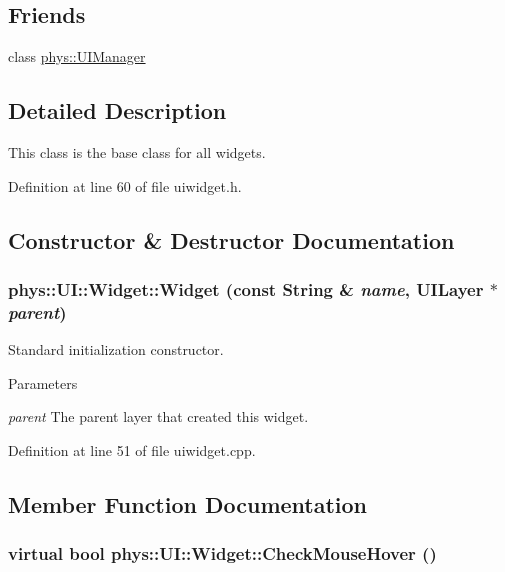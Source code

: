 \subsection*{Friends}
\begin{DoxyCompactItemize}
\item 
\hypertarget{classphys_1_1UI_1_1Widget_a4b52bf8c4d934bf192ccfc8198b55394}{
class \hyperlink{classphys_1_1UI_1_1Widget_a4b52bf8c4d934bf192ccfc8198b55394}{phys::UIManager}}
\label{d9/d48/classphys_1_1UI_1_1Widget_a4b52bf8c4d934bf192ccfc8198b55394}

\end{DoxyCompactItemize}


\subsection{Detailed Description}
This class is the base class for all widgets. 

Definition at line 60 of file uiwidget.h.



\subsection{Constructor \& Destructor Documentation}
\hypertarget{classphys_1_1UI_1_1Widget_a270ffcb858d43bbf94b0ce2089a10607}{
\subsubsection[{Widget}]{\setlength{\rightskip}{0pt plus 5cm}phys::UI::Widget::Widget (const {\bf String} \& {\em name}, \/  {\bf UILayer} $\ast$ {\em parent})}}
\label{d9/d48/classphys_1_1UI_1_1Widget_a270ffcb858d43bbf94b0ce2089a10607}


Standard initialization constructor. 


\begin{DoxyParams}{Parameters}
\item[{\em parent}]The parent layer that created this widget. \end{DoxyParams}


Definition at line 51 of file uiwidget.cpp.



\subsection{Member Function Documentation}
\hypertarget{classphys_1_1UI_1_1Widget_a613df6dbb42efe139d185043a00259dc}{
\subsubsection[{CheckMouseHover}]{\setlength{\rightskip}{0pt plus 5cm}virtual bool phys::UI::Widget::CheckMouseHover ()}}
\label{d9/d48/classphys_1_1UI_1_1Widget_a613df6dbb42efe139d185043a00259dc}


